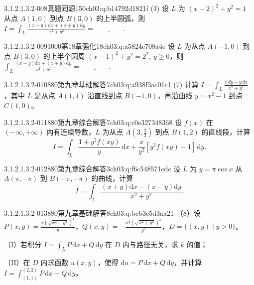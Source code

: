 \begin{q}{3.1.2.1.3.2-008}{真题同源150}{ch03:q:b14792d1821f}
(3) 设 $L$ 为 $(x-2)^2+y^2=1$ 从点 $A(1,0)$ 到点 $B(3,0)$ 的上半圆弧，则
$\displaystyle I=\int_L \frac{(x-y)\,\mathrm{d}x+(x+y)\,\mathrm{d}y}{x^2+y^2}=\underline{\hspace{4em}}.$
\end{q}

\begin{q}{3.1.2.1.3.2-009}{1000第18章强化18}{ch03:q:a5824e708a4e}
设 $L$ 为从点 $A(-1,0)$ 到点 $B(3,0)$ 的上半个圆周 $(x-1)^2+y^2=2^2,\ y\ge 0$，则
$\displaystyle \int_L \frac{(x-y)\mathrm{d}x+(x+y)\mathrm{d}y}{x^2+y^2} = \underline{\hspace{4em}}.$
\end{q}

\begin{q}{3.1.2.1.3.2-010}{880第九章基础解答7}{ch03:q:a938f3ac01c1}
(7) 计算 $\displaystyle I=\int_L \frac{x\,dy-y\,dx}{x^2+y^2}$，其中 $L$ 是从点 $A(1,1)$ 沿直线到点 $B(-1,0)$，再沿曲线 $y=x^2-1$ 到点 $C(1,0)$。
\end{q}

\begin{q}{3.1.2.1.3.2-011}{880第九章综合解答7}{ch03:q:c0e327348368}
设 $f(x)$ 在 $(-\infty,+\infty)$ 内有连续导数，$L$ 为从点 $A\left(3,\frac{2}{3}\right)$ 到点 $B(1,2)$ 的直线段，计算
\[
I=\int_L \frac{1+y^2 f(xy)}{y}\,\mathrm{d}x+\frac{x}{y^2}[y^2f(xy)-1]\,\mathrm{d}y.
\]
\end{q}

\begin{q}{3.1.2.1.3.2-012}{880第九章综合解答3}{ch03:q:f6c548571cdc}
设 $L$ 为 $y=\pi\cos x$ 从 $A(\pi,-\pi)$ 到 $B(-\pi,-\pi)$ 的曲线，计算 \[ I=\int_L \frac{(x+y)\mathrm{d}x-(x-y)\mathrm{d}y}{x^2+y^2}. \]
\end{q}

\begin{q}{3.1.2.1.3.2-013}{880第九章基础解答8}{ch03:q:bcb3c5d3aa21}
（8）设 $P(x,y)=\frac{x\left(\sqrt{x^2+y^2}\right)^k}{y}$，$Q(x,y)=-\frac{x^2\left(\sqrt{x^2+y^2}\right)^k}{y^2}$，$D=\{(x,y)\mid y>0\}$。

（I）若积分 $\displaystyle I=\int_L P\,\mathrm{d}x+Q\,\mathrm{d}y$ 在 $D$ 内与路径无关，求 $k$ 的值；

（II）在 $D$ 内求函数 $u(x,y)$，使得 $\mathrm{d}u=P\,\mathrm{d}x+Q\,\mathrm{d}y$，并计算 $\displaystyle I=\int_{(1,1)}^{(2,2)}P\,\mathrm{d}x+Q\,\mathrm{d}y$。
\end{q}

